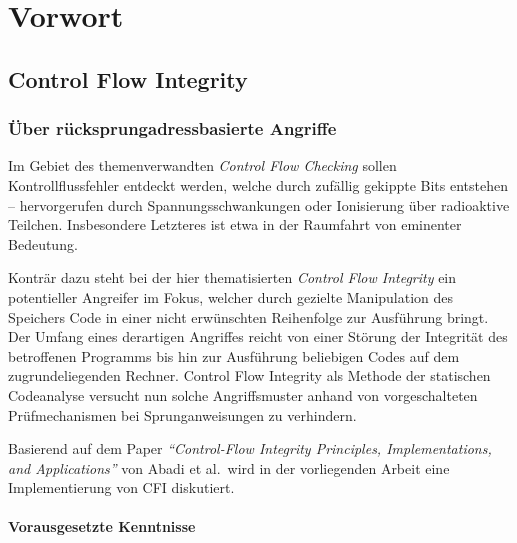 \documentclass[12pt,%
               oneside,
               a4paper]{uiothesis}
\author{Stefan Braun}
\begin{document}
  \pagestyle{uio}

  \frontmatter
    \maketitle
    \part{Vorwort}
    \clearpage
    
    \cleardoublepage
    \tableofcontents
    \clearpage
    \listoffigures
    \clearpage
    \listoftables
    \listofsourcecode
    \mainmatter

\chapter{Control Flow Integrity}
\section{Über rücksprungadressbasierte Angriffe}
\label{sec:ret_attack}
Im Gebiet des themenverwandten \emph{Control Flow Checking} sollen Kontrollflussfehler entdeckt werden, welche durch zufällig gekippte Bits entstehen -- hervorgerufen durch Spannungsschwankungen oder Ionisierung über radioaktive Teilchen. Insbesondere Letzteres ist etwa in der Raumfahrt von eminenter Bedeutung.

Konträr dazu steht bei der hier thematisierten \emph{Control Flow Integrity} ein potentieller Angreifer im Fokus, welcher durch gezielte Manipulation des Speichers Code in einer nicht erwünschten Reihenfolge zur Ausführung bringt. Der Umfang eines derartigen Angriffes reicht von einer Störung der Integrität des betroffenen Programms bis hin zur Ausführung beliebigen Codes auf dem zugrundeliegenden Rechner. Control Flow Integrity als Methode der statischen Codeanalyse versucht nun solche Angriffsmuster anhand von vorgeschalteten Prüfmechanismen bei Sprunganweisungen zu verhindern.

Basierend auf dem Paper \emph{\enquote{Control-Flow Integrity Principles, Implementations, and Applications}} von Abadi et al.\,\cite{Abadi.2009} wird in der vorliegenden Arbeit eine Implementierung von CFI diskutiert.

\subsection{Vorausgesetzte Kenntnisse}
\end{document}

